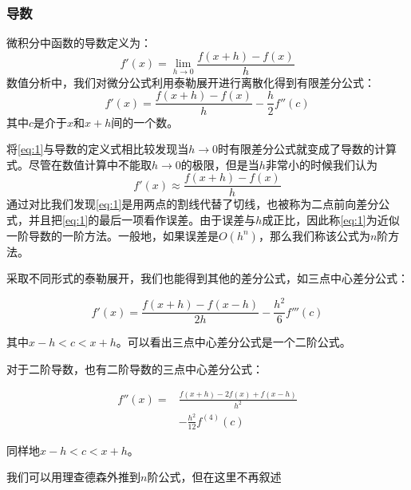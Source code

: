 \documentclass[UTF8,a4paper,10pt]{ctexart}
\begin{document}
\begin{multicols}{2}
            \subsubsection{导数}
            微积分中函数的导数定义为：
            \begin{equation}
                f'(x) = \lim_{h\to 0}\frac{f(x+h)-f(x)}{h}
            \end{equation}
            数值分析中，我们对微分公式利用泰勒展开进行离散化得到有限差分公式：
            \begin{equation}\label{eq:1}
                f'(x) = \frac{f(x+h)-f(x)}{h} - \frac{h}{2}f''(c)
            \end{equation}
            其中$c$是介于$x$和$x+h$间的一个数。\par
            将\eqref{eq:1}与导数的定义式相比较发现当$h\to 0$时有限差分公式就变成了导数的计算式。尽管在数值计算中不能取$h\to 0$的极限，但是当$h$非常小的时候我们认为
            \begin{equation}
                f'(x) \approx \frac{f(x+h)-f(x)}{h}
            \end{equation}
            通过对比我们发现\eqref{eq:1}是用两点的割线代替了切线，也被称为二点前向差分公式，并且把\eqref{eq:1}的最后一项看作误差。由于误差与$h$成正比，因此称\eqref{eq:1}为近似一阶导数的一阶方法。一般地，如果误差是$O(h^n)$，那么我们称该公式为$n$阶方法。\par
            采取不同形式的泰勒展开，我们也能得到其他的差分公式，如三点中心差分公式：
            \begin{footnotesize}
                \begin{equation}
                    f'(x) = \frac{f(x+h)-f(x-h)}{2h} - \frac{h^2}{6}f'''(c)
                \end{equation}
            \end{footnotesize}
            其中$x-h < c < x+h$。可以看出三点中心差分公式是一个二阶公式。\par
            对于二阶导数，也有二阶导数的三点中心差分公式：
            \begin{footnotesize}
                \begin{equation}
                    \begin{split}
                        f''(x) = &\frac{f(x+h)-2f(x)+f(x-h)}{h^2}\\
                        &-\frac{h^2}{12}f^{(4)}(c)
                    \end{split}
                \end{equation}
            \end{footnotesize}
            同样地$x-h < c < x+h$。\par
            我们可以用理查德森外推到$n$阶公式，但在这里不再叙述

\end{multicols}
\end{document}
